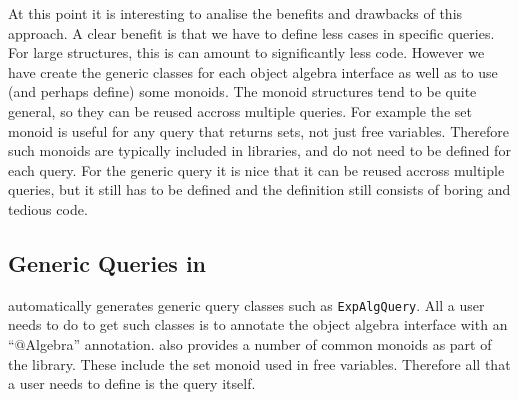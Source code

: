 At this point it is interesting to analise the benefits and drawbacks
of this approach. A clear benefit is that we have to define less cases
in specific queries. For large structures, this is can amount to 
significantly less code. However we have create the generic
classes for each object algebra interface as well as to use (and
perhaps define) some monoids. The monoid structures tend to be
quite general, so they can be reused accross multiple queries. For example
the set monoid is useful for any query that returns sets, not just
free variables. Therefore such monoids are typically included in
libraries, and do not need to be defined for each query.  
For the generic query it is nice that it can be reused accross multiple 
queries, but it still has to be defined and the definition still 
consists of boring and tedious code.


\begin{comment}
But the result for an expression can only be a null list based on the
monoid. Thus in the freeVars query, furthermore, we expect the
variables to store their names into a list, and by using the monoid,
freeVars can be implemented. See Fig.~\ref{freevars_with_monoid}.


When the interface \lstinline{FreeVarsExpAlg} is used, an object of
the \lstinline{FreeVarsMonoid} is then created. As we can see, it is
needless for a user to write an exclusive traversal fully for a data
structure. Nothing but a monoid is required together with a few
methods being overwritten. And furthermore, a monoid can usually be
shared among query algebras with the same data type.
\end{comment}

\subsection{Generic Queries in \name}

\name automatically generates generic query classes such as 
\lstinline{ExpAlgQuery}. All a user needs to do to get such classes 
is to annotate the object algebra interface with an ``$@$Algebra''
annotation. \name also provides a number of common monoids as 
part of the library. These include the set monoid used in free variables. 
Therefore all that a user needs to define is the query itself. 
